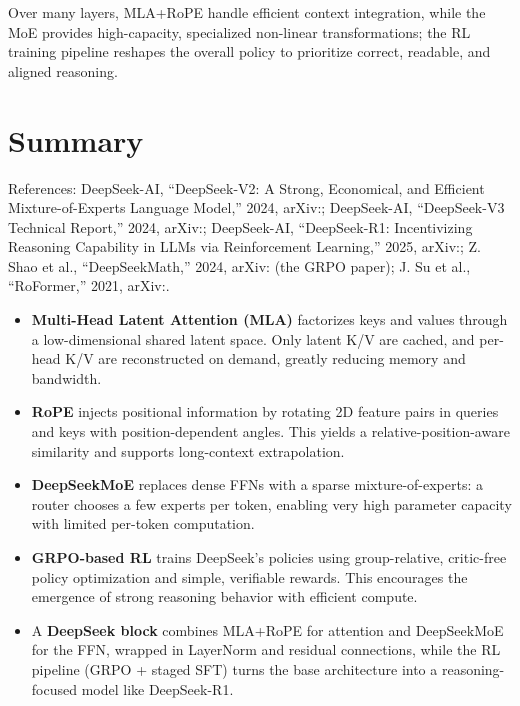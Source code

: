 \documentclass[11pt]{article}
\theoremstyle{remark}
\begin{document}
Over many layers, MLA+RoPE handle efficient context integration, while the MoE provides high-capacity, specialized non-linear transformations; the RL training pipeline reshapes the overall policy to prioritize correct, readable, and aligned reasoning.

\section{Summary}

References: DeepSeek-AI, ``DeepSeek-V2: A Strong, Economical, and Efficient Mixture-of-Experts Language Model,'' 2024, arXiv:; DeepSeek-AI, ``DeepSeek-V3 Technical Report,'' 2024, arXiv:; DeepSeek-AI, ``DeepSeek-R1: Incentivizing Reasoning Capability in LLMs via Reinforcement Learning,'' 2025, arXiv:; Z. Shao et al., ``DeepSeekMath,'' 2024, arXiv: (the GRPO paper); J. Su et al., ``RoFormer,'' 2021, arXiv:.


\begin{itemize}
  \item \textbf{Multi-Head Latent Attention (MLA)} factorizes keys and values through a low-dimensional shared latent space. Only latent K/V are cached, and per-head K/V are reconstructed on demand, greatly reducing memory and bandwidth.
  \item \textbf{RoPE} injects positional information by rotating 2D feature pairs in queries and keys with position-dependent angles. This yields a relative-position-aware similarity and supports long-context extrapolation.
  \item \textbf{DeepSeekMoE} replaces dense FFNs with a sparse mixture-of-experts: a router chooses a few experts per token, enabling very high parameter capacity with limited per-token computation.
  \item \textbf{GRPO-based RL} trains DeepSeek's policies using group-relative, critic-free policy optimization and simple, verifiable rewards. This encourages the emergence of strong reasoning behavior with efficient compute.
  \item A \textbf{DeepSeek block} combines MLA+RoPE for attention and DeepSeekMoE for the FFN, wrapped in LayerNorm and residual connections, while the RL pipeline (GRPO + staged SFT) turns the base architecture into a reasoning-focused model like DeepSeek-R1.
\end{itemize}
\end{document}
